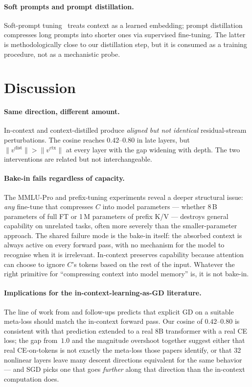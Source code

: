 \documentclass{article}
\begin{document}
\paragraph{Soft prompts and prompt distillation.}
Soft-prompt tuning~\citep{lester2021power} treats context as a learned
embedding; prompt distillation~\citep{askell2021general} compresses long
prompts into shorter ones via supervised fine-tuning. The latter is
methodologically close to our distillation step, but it is consumed as a
training procedure, not as a mechanistic probe.

\section{Discussion}
\label{sec:discussion}

\paragraph{Same direction, different amount.}
In-context and context-distilled produce \emph{aligned but not
identical} residual-stream perturbations. The cosine reaches
$0.42$--$0.80$ in late layers, but $\|v^\text{dist}\| > \|v^\text{ctx}\|$
at every layer with the gap widening with depth. The two interventions
are related but not interchangeable.

\paragraph{Bake-in fails regardless of capacity.}
The MMLU-Pro and prefix-tuning experiments reveal a deeper structural
issue: \emph{any} fine-tune that compresses $C$ into model parameters
--- whether 8\,B parameters of full FT or 1\,M parameters of prefix
K/V --- destroys general capability on unrelated tasks, often more
severely than the smaller-parameter approach. The shared failure
mode is the bake-in itself: the absorbed context is always active on
every forward pass, with no mechanism for the model to recognise
when it is irrelevant. In-context preserves capability because
attention can choose to ignore $C$'s tokens based on the rest of the
input. Whatever the right primitive for ``compressing context into
model memory'' is, it is not bake-in.

\paragraph{Implications for the in-context-learning-as-GD literature.}
The line of work from \citet{vonoswald2023transformers} and follow-ups
predicts that explicit GD on a suitable meta-loss should match the
in-context forward pass. Our cosine of $0.42$--$0.80$ is consistent with
that prediction extended to a real 8B transformer with a real CE loss;
the gap from~$1.0$ and the magnitude overshoot together suggest either
that real CE-on-tokens is not exactly the meta-loss those papers
identify, or that 32 nonlinear layers leave many descent directions
equivalent for the same behavior --- and SGD picks one that goes
\emph{further} along that direction than the in-context computation does.
\end{document}

